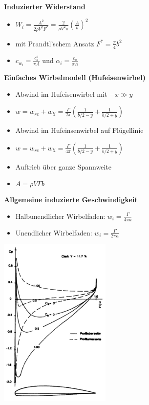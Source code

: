 \documentclass[8pt, landscape, fleqn]{scrartcl}
\begin{document}
\begin{multicols*}{3}
\textbf{Induzierter Widerstand}




\begin{itemize} 
    \item $W_i = \frac{A^2}{2\rho V^2F^*} = \frac{2}{\rho V^2 \pi}\left(\frac{A}{b}\right)^2$
    \item mit Prandtl'schem Ansatz $F^* = \frac{\pi}{4}b^2$
    \item $c_{w_i} = \frac{c_a^2}{\pi \Lambda}$ und $\alpha_i = \frac{c_a}{\pi \Lambda}$
\end{itemize}

\textbf{Einfaches Wirbelmodell (Hufeisenwirbel)}

\begin{itemize}
    \item Abwind im Hufeisenwirbel mit $-x \gg y$
    \item $w = w_{re}+ w_{li} = \frac{\Gamma}{2\pi}\left(\frac{1}{b/2-y}+\frac{1}{b/2+y}\right)$
    \item Abwind im Hufeinsenwirbel auf Flügellinie
    \item $w = w_{re}+ w_{li} = \frac{\Gamma}{4\pi}\left(\frac{1}{b/2-y}+\frac{1}{b/2+y}\right)$
    \item Auftrieb über ganze Spannweite
    \item $A = \rho V \Gamma b$
\end{itemize}
\textbf{Allgemeine induzierte Geschwindigkeit}
\begin{itemize}
    \item Halbunendlicher Wirbelfaden: $w_i = \frac{\Gamma}{4\pi a}$
    \item Unendlicher Wirbelfaden: $w_i = \frac{\Gamma}{2\pi a}$
\end{itemize}

\begin{center}
    \includegraphics[width = 5.5cm]{images/Druckverteilung_am_Profil.png}
\end{center}



\end{multicols*}
\end{document}
